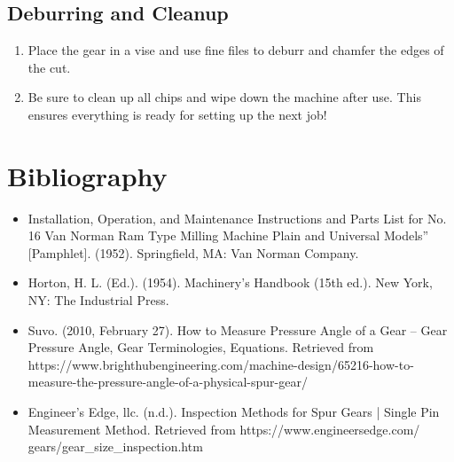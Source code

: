\documentclass[12pt,twoside,letterpaper]{article}
\begin{document}
\subsection{Deburring and Cleanup}
\begin{enumerate}
\item Place the gear in a vise and use fine files to deburr and chamfer the edges of the cut.
\item Be sure to clean up all chips and wipe down the machine after use. This ensures everything is ready for setting up the next job!

\end{enumerate}



\section{Bibliography}

\begin{itemize}
	\item Installation, Operation, and Maintenance Instructions and Parts List for No. 16 Van Norman Ram Type Milling Machine Plain and Universal Models'' [Pamphlet]. (1952). Springfield, MA: Van Norman Company. 

	\item Horton, H. L. (Ed.). (1954). Machinery's Handbook (15th ed.). New York, NY: The Industrial Press. 
	\item Suvo. (2010, February 27). How to Measure Pressure Angle of a Gear – Gear Pressure Angle, Gear Terminologies, Equations. Retrieved from https://www.brighthubengineering.com/machine-design/65216-how-to-measure-the-pressure-angle-of-a-physical-spur-gear/
	\item Engineer's Edge, llc. (n.d.). Inspection Methods for Spur Gears | Single Pin Measurement Method. Retrieved from https://www.engineersedge.com/
		gears/gear\_size\_inspection.htm 

\end{itemize}
\end{document}
